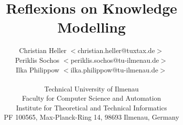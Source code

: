 %
%
%
%
%
%
%

\title{Reflexions on Knowledge Modelling}
\author{
    Christian Heller \(<\)christian.heller@tuxtax.de\(>\)\\
    Periklis Sochos \(<\)periklis.sochos@tu-ilmenau.de\(>\)\\
    Ilka Philippow \(<\)ilka.philippow@tu-ilmenau.de\(>\)\\\\
    Technical University of Ilmenau\\
    Faculty for Computer Science and Automation\\
    Institute for Theoretical and Technical Informatics\\
    PF 100565, Max-Planck-Ring 14, 98693 Ilmenau, Germany
}
